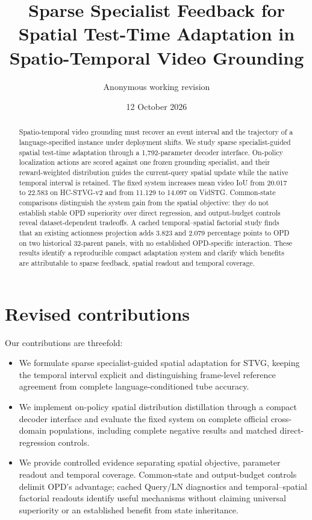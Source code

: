 \documentclass[11pt]{article}
\title{Sparse Specialist Feedback for Spatial Test-Time Adaptation in Spatio-Temporal Video Grounding}
\author{Anonymous working revision}
\date{12 October 2026}
\begin{document}
\maketitle
\begin{abstract}
Spatio-temporal video grounding must recover an event interval and the trajectory
of a language-specified instance under deployment shifts. We study sparse
specialist-guided spatial test-time adaptation through a 1,792-parameter
decoder interface. On-policy localization actions are scored against one
frozen grounding specialist, and their reward-weighted distribution guides
the current-query spatial update while the native temporal interval is retained.
The fixed system increases mean video IoU from 20.017 to 22.583 on HC-STVG-v2
and from 11.129 to 14.097 on VidSTG. Common-state comparisons distinguish the
system gain from the spatial objective: they do not establish stable OPD
superiority over direct regression, and output-budget controls reveal
dataset-dependent tradeoffs. A cached temporal--spatial factorial study finds
that an existing actionness projection adds 3.823 and 2.079 percentage points
to OPD on two historical 32-parent panels, with no established OPD-specific
interaction. These results identify a reproducible compact adaptation system
and clarify which benefits are attributable to sparse feedback, spatial
readout and temporal coverage.
\end{abstract}
\section{Revised contributions}
Our contributions are threefold:
\begin{itemize}
\item We formulate sparse specialist-guided spatial adaptation for STVG,
keeping the temporal interval explicit and distinguishing frame-level
reference agreement from complete language-conditioned tube accuracy.
\item We implement on-policy spatial distribution distillation through a
compact decoder interface and evaluate the fixed system on complete official
cross-domain populations, including complete negative results and matched
direct-regression controls.
\item We provide controlled evidence separating spatial objective, parameter
readout and temporal coverage. Common-state and output-budget controls delimit
OPD's advantage; cached Query/LN diagnostics and temporal--spatial factorial
readouts identify useful mechanisms without claiming universal superiority or
an established benefit from state inheritance.
\end{itemize}
\end{document}
